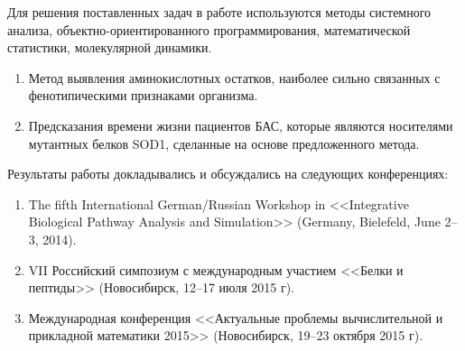{\methods} Для решения поставленных задач в работе используются методы системного анализа, объектно-ориентированного программирования, математической статистики, молекулярной динамики.

{}
\begin{enumerate}
  \item Метод выявления аминокислотных остатков, наиболее сильно связанных с фенотипическими признаками организма.
  \item Предсказания времени жизни пациентов БАС, которые являются носителями мутантных белков SOD1, сделанные на основе предложенного метода.
\end{enumerate}



{\probation}
Результаты работы докладывались и обсуждались на следующих конференциях:
\begin{enumerate}
\item The fifth International German/Russian Workshop in <<Integrative Biological Pathway Analysis and Simulation>> (Germany, Bielefeld, June 2--3, 2014).
\item VII Российский симпозиум с международным участием <<Белки и пептиды>> (Новосибирск, 12--17 июля 2015 г).
\item Международная конференция <<Актуальные проблемы вычислительной и прикладной математики 2015>> (Новосибирск, 19--23 октября 2015 г).
\end{enumerate}



